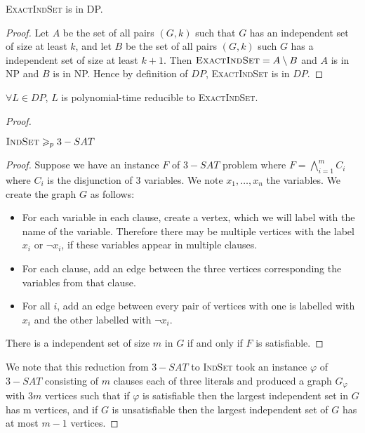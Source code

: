 \begin{propo}\label{3:1}
    \textsc{ExactIndSet} is in DP.
\end{propo}
\begin{proof}
    Let $A$ be the set of all pairs $(G, k)$ such that $G$ has an independent set of size at least $k$, and let $B$ be the set of all pairs $(G, k)$ such $G$ has a independent set of size at least $k+1$. Then $\textsc{ExactIndSet}=A \setminus B$ and $A$ is in NP and $B$ is in NP. Hence by definition of $DP$, \textsc{ExactIndSet} is in $DP$.
\end{proof}

\begin{propo}\label{3:2}
    $\forall L \in DP$, $L$ is polynomial-time reducible to \textsc{ExactIndSet}.
\end{propo}
\begin{proof}
    \begin{lemma}
        $\textsc{IndSet} \geqslant_p 3-SAT$
    \end{lemma}
    \begin{proof}
        Suppose we have an instance $F$ of $3-SAT$ problem where $F=\bigwedge\limits_{i=1}^m C_i$ where $C_i$ is the disjunction of 3 variables. We note $x_1,\ldots,x_n$ the variables. We create the graph $G$ as follows:
        \begin{itemize}
            \item For each variable in each clause, create a vertex, which we will label with the name of the variable. Therefore there may be multiple vertices with the label $x_i$ or $\neg x_i$, if these variables appear in multiple clauses.
            \item For each clause, add an edge between the three vertices corresponding the variables from that clause.
            \item For all $i$, add an edge between every pair of vertices with one is labelled with $x_i$ and the other labelled with $\neg x_i$.
        \end{itemize}
        
        There is a independent set of size $m$ in $G$ if and only if $F$ is satisfiable.    
    \end{proof}
    
    We note that this reduction from $3-SAT$ to \textsc{IndSet} took an instance $\varphi$ of $3-SAT$ consisting of $m$ clauses each of three literals and produced a graph $G_\varphi$ with $3 m$ vertices such that if $\varphi$ is satisfiable then the largest independent set in $G$ has m vertices, and if $G$ is unsatisfiable then the largest independent set of $G$ has at most $m - 1$ vertices. 
    

\end{proof}
